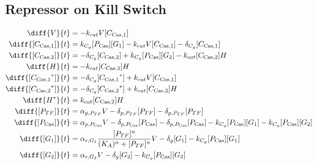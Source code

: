 \subsection{Repressor on Kill Switch}
\label{s:TF_delayed_kill_switch}

\begin{align}
\diff{\vectorGen{}}{t} & = - \casCutRate{{}}\vectorGen{}\conc{\cplx{\cas}{1}}\\
\diff{\conc{\cplx{\cas}{1}}}{t} & =  \gRnaBind{}\conc{\proSp{\cas{}}}\conc{\gRna{1}} - \casCutRate{{}}\vectorGen{}\conc{\cplx{\cas}{1}} - \casCompDegradeRate{}\conc{\cplx{\cas}{1}}\\
\diff{\conc{\cplx{\cas}{2}}}{t} & = - \casCompDegradeRate{}\conc{\cplx{\cas}{2}} + \gRnaBind{}\conc{\proSp{\cas{}}}\conc{\gRna{2}} - \casCutRate{{}}\conc{\cplx{\cas}{2}}\hostGen{}\\
\diff{\hostGen{}}{t} & = - \casCutRate{{}}\conc{\cplx{\cas}{2}}\hostGen{}\\
\diff{\conc{\bound{\cplx{\cas}{1}}}}{t} & = - \casCompDegradeRate{}\conc{\bound{\cplx{\cas}{1}}} + \casCutRate{{}}\vectorGen{}\conc{\cplx{\cas}{1}}\\
\diff{\conc{\bound{\cplx{\cas}{2}}}}{t} & = - \casCompDegradeRate{}\conc{\bound{\cplx{\cas}{2}}} + \casCutRate{{}}\conc{\cplx{\cas}{2}}\hostGen{}\\
\diff{\edited{\hostGen{}}}{t} & =  \casCutRate{{}}\conc{\cplx{\cas}{2}}\hostGen{}\\
\diff{\conc{\proSp{TF}}}{t} & =  \txtlRate{\proSp{TF}}\vectorGen{} - \proDegradeRate{\proSp{TF}}\conc{\proSp{TF}} - \proDegradeRate{\proSp{TF}}\conc{\proSp{TF}}\\
\diff{\conc{\proSp{\cas{}}}}{t} & =  \txtlRate{\proSp{\cas{}}}\vectorGen{} - \proDegradeRate{\proSp{\cas{}}}\conc{\proSp{\cas{}}} - \proDegradeRate{\proSp{\cas{}}}\conc{\proSp{\cas{}}} - \gRnaBind{}\conc{\proSp{\cas{}}}\conc{\gRna{1}} - \gRnaBind{}\conc{\proSp{\cas{}}}\conc{\gRna{2}}\\
\diff{\conc{\gRna{1}}}{t} & =  \txRate{\gRna{1}}\frac{\conc{\proSp{TF}}^n}{(K_A)^n + \conc{\proSp{TF}}^n}\vectorGen{} - \rnaDegradeRate{}\conc{\gRna{1}} - \gRnaBind{}\conc{\proSp{\cas{}}}\conc{\gRna{1}}\\
\diff{\conc{\gRna{2}}}{t} & =  \txRate{\gRna{2}}\vectorGen{} - \rnaDegradeRate{}\conc{\gRna{2}} - \gRnaBind{}\conc{\proSp{\cas{}}}\conc{\gRna{2}}
\end{align}

